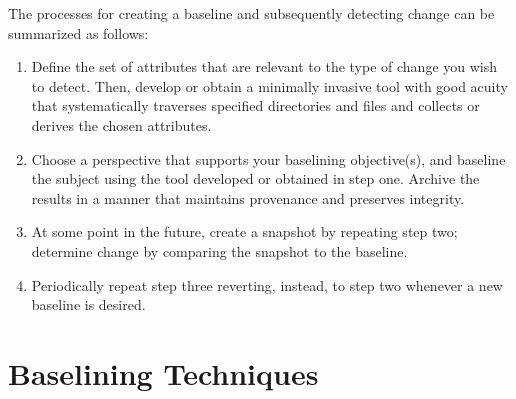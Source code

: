 \documentclass[10pt]{article}
\begin{document}
The processes for creating a baseline and subsequently detecting
change can be summarized as follows:

\begin{enumerate}

  \item
  Define the set of attributes that are relevant to the type of
  change you wish to detect.  Then, develop or obtain a minimally
  invasive tool with good acuity that systematically traverses
  specified directories and files and collects or derives the chosen
  attributes.

  \item
  Choose a perspective that supports your baselining objective(s),
  and baseline the subject using the tool developed or obtained in
  step one.  Archive the results in a manner that maintains provenance
  and preserves integrity.

  \item
  At some point in the future, create a snapshot by repeating step
  two; determine change by comparing the snapshot to the baseline.

  \item
  Periodically repeat step three reverting, instead, to step two
  whenever a new baseline is desired.

%
%
%
%
%

\end{enumerate}

\section{Baselining Techniques}
\end{document}
